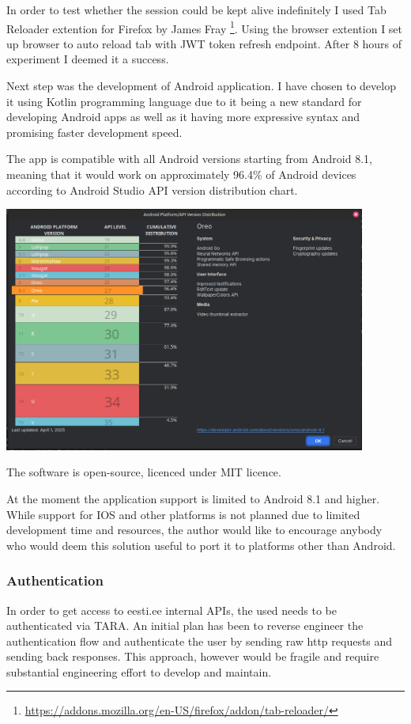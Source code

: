 In order to test whether the session could be kept alive indefinitely I used Tab Reloader extention for Firefox by James Fray \footnote{\url{https://addons.mozilla.org/en-US/firefox/addon/tab-reloader/}}. Using the browser extention I set up browser to auto reload tab with JWT token refresh endpoint. After 8 hours of experiment I deemed it a success.

Next step was the development of Android application. I have chosen to develop it using Kotlin programming language due to it being a new standard for developing Android apps as well as it having more expressive syntax and promising faster development speed.

The app is compatible with all Android versions starting from Android 8.1, meaning that it would work on approximately 96.4\% of Android devices according to Android Studio API version distribution chart.

\includegraphics[width=450px]{english/figures/Screenshot from 2025-08-04 19-37-39.png}

The software is open-source, licenced under MIT licence.

At the moment the application support is limited to Android 8.1 and higher. While support for IOS and other platforms is not planned due to limited development time and resources, the author would like to encourage anybody who would deem this solution useful to port it to platforms other than Android.

\subsubsection{Authentication}
In order to get access to eesti.ee internal APIs, the used needs to be authenticated via TARA. An initial plan has been to reverse engineer the authentication flow and authenticate the user by sending raw http requests and sending back responses. This approach, however would be fragile and require substantial engineering effort to develop and maintain.

